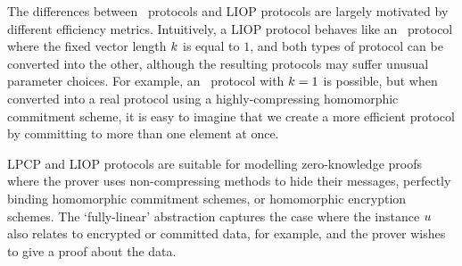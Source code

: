 The differences between \ILC\ protocols and LIOP protocols are largely motivated by different efficiency metrics. Intuitively, a LIOP protocol behaves like an \ILC\ protocol where the fixed vector length $k$ is equal to $1$, and both types of protocol can be converted into the other, although the resulting protocols may suffer unusual parameter choices. For example, an \ILC\ protocol with $k = 1$ is possible, but when converted into a real protocol using a highly-compressing homomorphic commitment scheme, it is easy to imagine that we create a more efficient protocol by committing to more than one element at once.

LPCP and LIOP protocols are suitable for modelling zero-knowledge proofs where the prover uses non-compressing methods to hide their messages, perfectly binding homomorphic commitment schemes, or homomorphic encryption schemes. The `fully-linear' abstraction captures the case where the instance $u$ also relates to encrypted or committed data, for example, and the prover wishes to give a proof about the data.